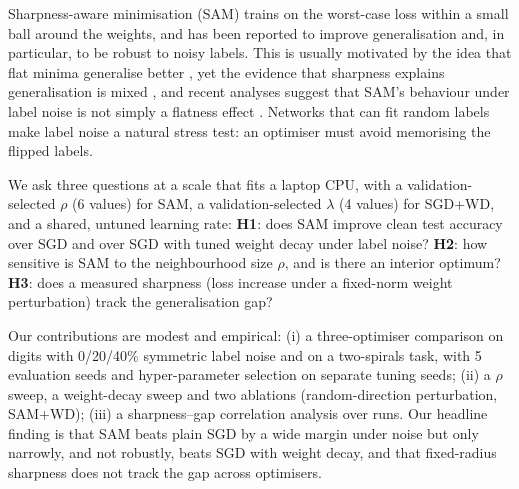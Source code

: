 Sharpness-aware minimisation (SAM) \cite{foret2020sharpness} trains on the worst-case loss within a small ball around the weights, and has been reported to improve generalisation and, in particular, to be robust to noisy labels. This is usually motivated by the idea that flat minima generalise better \cite{keskar2016large}, yet the evidence that sharpness explains generalisation is mixed \cite{jiang2019fantastic,andriushchenko2023modern}, and recent analyses suggest that SAM's behaviour under label noise is not simply a flatness effect \cite{baek2024why,andriushchenko2022understanding}. Networks that can fit random labels \cite{zhang2016understanding} make label noise a natural stress test: an optimiser must avoid memorising the flipped labels.

We ask three questions at a scale that fits a laptop CPU, with a validation-selected $\rho$ (6 values) for SAM, a validation-selected $\lambda$ (4 values) for SGD+WD, and a shared, untuned learning rate:
\textbf{H1}: does SAM improve clean test accuracy over SGD and over SGD with tuned weight decay under label noise? \textbf{H2}: how sensitive is SAM to the neighbourhood size $\rho$, and is there an interior optimum? \textbf{H3}: does a measured sharpness (loss increase under a fixed-norm weight perturbation) track the generalisation gap?

Our contributions are modest and empirical: (i) a three-optimiser comparison on digits with 0/20/40\% symmetric label noise and on a two-spirals task, with 5 evaluation seeds and hyper-parameter selection on separate tuning seeds; (ii) a $\rho$ sweep, a weight-decay sweep and two ablations (random-direction perturbation, SAM+WD); (iii) a sharpness--gap correlation analysis over  runs. Our headline finding is that SAM beats plain SGD by a wide margin under noise but only narrowly, and not robustly, beats SGD with weight decay, and that fixed-radius sharpness does not track the gap across optimisers.
